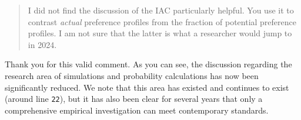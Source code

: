 \documentclass[a4paper, 12pt]{scrartcl}
\begin{document}
\begin{quotation}
I did not find the discussion of the IAC particularly helpful. You use it to contrast \textit{actual}
preference profiles from the fraction of potential preference profiles. I am not sure that the
latter is what a researcher would jump to in 2024.
\end{quotation}

Thank you for this valid comment. As you can see, the discussion regarding the research area of simulations and probability calculations has now been significantly reduced. We note that this area has existed and continues to exist (around line \texttt{22}), but it has also been clear for several years that only a comprehensive empirical investigation can meet contemporary standards.






\end{document}
